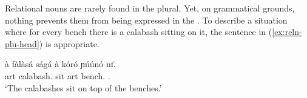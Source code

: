 \begin{exe}
\begin{exe}
\begin{exe}
\begin{exe}
\begin{exe}
\begin{exe}
\begin{exe}
\begin{exe}
% 
% 
% 
% 
% 



Relational nouns are rarely found in the plural. Yet, on grammatical grounds, nothing prevents them from being expressed in the . To describe a situation where  for every bench there is a calabash sitting on it, the sentence in (\ref{ex:reln-plu-head}) is appropriate.


\ea\label{ex:reln-plu-head}
\gll à fàlàsá ságá à kóró ɲúúnó nɪ̄.\\
{\sc art} calabash.{\pl}  sit {\sc art} bench.{\pl}  {\reln .\pl} {\postp}\\
\glt `The calabashes sit on top of the benches.' 
\z


\end{exe}
\end{exe}
\end{exe}
\end{exe}
\end{exe}
\end{exe}
\end{exe}
\end{exe}
